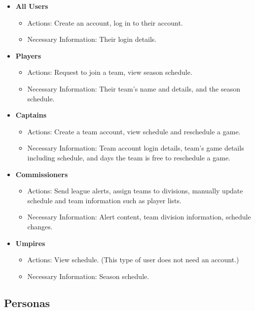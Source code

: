 \documentclass[12pt]{article}
\begin{document}
\begin{itemize}
  \item \textbf{All Users}
  \begin{itemize}
    \item Actions: Create an account, log in to their account.
    \item Necessary Information: Their login details.
  \end{itemize}
  \item \textbf{Players}
  \begin{itemize}
    \item Actions: Request to join a team, view season schedule.
    \item Necessary Information: Their team's name and details, and the season
    schedule.
  \end{itemize}
  \item \textbf{Captains}
  \begin{itemize}
    \item Actions: Create a team account, view schedule and reschedule a game.
    \item Necessary Information: Team account login details, team's game
    details including schedule, and days the team is free to reschedule a
    game.
  \end{itemize}
  \item \textbf{Commissioners}
  \begin{itemize}
    \item Actions: Send league alerts, assign teams to divisions, manually
    update schedule and team information such as player lists.
    \item Necessary Information: Alert content, team division information,
    schedule changes.
  \end{itemize}
  \item \textbf{Umpires}
  \begin{itemize}
    \item Actions: View schedule. (This type of user does not need an
    account.)
    \item Necessary Information: Season schedule.
  \end{itemize}
\end{itemize}

\subsection{Personas}
\end{document}
